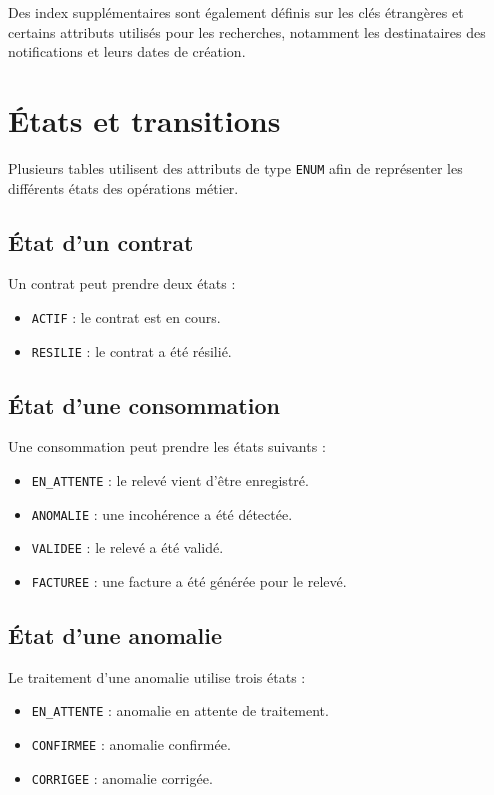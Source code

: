 Des index supplémentaires sont également définis sur les clés étrangères et certains attributs utilisés pour les recherches, notamment les destinataires des notifications et leurs dates de création.

\section{États et transitions}

Plusieurs tables utilisent des attributs de type \texttt{ENUM} afin de représenter les différents états des opérations métier.

\subsection*{État d'un contrat}

Un contrat peut prendre deux états :

\begin{itemize}[leftmargin=*]
    \item \texttt{ACTIF} : le contrat est en cours.
    \item \texttt{RESILIE} : le contrat a été résilié.
\end{itemize}

\subsection*{État d'une consommation}

Une consommation peut prendre les états suivants :

\begin{itemize}[leftmargin=*]
    \item \texttt{EN\_ATTENTE} : le relevé vient d'être enregistré.
    \item \texttt{ANOMALIE} : une incohérence a été détectée.
    \item \texttt{VALIDEE} : le relevé a été validé.
    \item \texttt{FACTUREE} : une facture a été générée pour le relevé.
\end{itemize}

\subsection*{État d'une anomalie}

Le traitement d'une anomalie utilise trois états :

\begin{itemize}[leftmargin=*]
    \item \texttt{EN\_ATTENTE} : anomalie en attente de traitement.
    \item \texttt{CONFIRMEE} : anomalie confirmée.
    \item \texttt{CORRIGEE} : anomalie corrigée.
\end{itemize}

